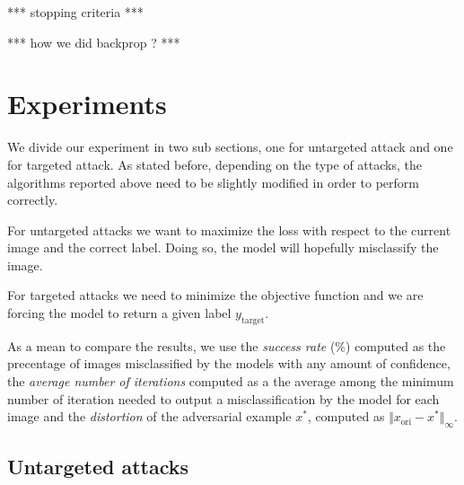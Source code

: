 \documentclass[10pt,twocolumn,letterpaper, english]{article}
\theoremstyle{definition}
\theoremstyle{plain}
\theoremstyle{plain}
\theoremstyle{plain}
\theoremstyle{plain}
\theoremstyle{remark}
\theoremstyle{remark}
\theoremstyle{definition}
\theoremstyle{definition}
\theoremstyle{definition}
\theoremstyle{definition}
\begin{document}
*** stopping criteria *** 

*** how we did backprop ? *** 


\section{Experiments}
We divide our experiment in two sub sections, one for untargeted attack and one for targeted attack. As stated before, depending on the type of attacks, the algorithms reported above need to be slightly modified in order to perform correctly.

For untargeted attacks we want to maximize the loss with respect to the current image and the correct label. Doing so, the model will hopefully misclassify the image.

For targeted attacks we need to minimize the objective function and we are forcing the model to return a given label $y_{\text{target}}$.

As a mean to compare the results, we use the \textit{success rate} ($\%$) computed as the precentage of images misclassified by the models with any amount of confidence, the \textit{average number of iterations} computed as a the average among the minimum number of iteration needed to output a misclassification by the model for each image and the \textit{distortion} of the adversarial example $x^\ast$, computed as $\Vert x_{\text{ori}} - x^\ast \Vert_{\infty}$.

\subsection{Untargeted attacks}


 
\end{document}
